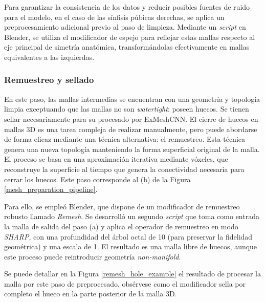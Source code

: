 Para garantizar la consistencia de los datos y reducir posibles fuentes de ruido para el modelo, en el caso de las sínfisis púbicas derechas, se aplica un preprocesamiento adicional previo al paso de limpieza. Mediante un \textit{script} en Blender, se utiliza el modificador de espejo para reflejar estas mallas respecto al eje principal de simetría anatómica, transformándolas efectivamente en mallas equivalentes a las izquierdas.

\subsubsection{Remuestreo y sellado}
En este paso, las mallas intermedias se encuentran con una geometría y topología limpia exceptuando que las mallas no son \textit{watertight}: poseen huecos. Se tienen sellar necesariamente para su procesado por ExMeshCNN. El cierre de huecos en mallas 3D es una tarea compleja de realizar manualmente, pero puede abordarse de forma eficaz mediante una técnica alternativa: el remuestreo. Esta técnica genera una nueva topología manteniendo la forma superficial original de la malla. El proceso se basa en una aproximación iterativa mediante vóxeles, que reconstruye la superficie al tiempo que genera la conectividad necesaria para cerrar los huecos. Este paso corresponde al (b) de la Figura \ref{mesh_preparation_pipeline}.

Para ello, se empleó Blender, que dispone de un modificador de remuestreo robusto llamado \textit{Remesh}. Se desarrolló un segundo \textit{script} que toma como entrada la malla de salida del paso (a) y aplica el operador de remuestreo en modo \textit{SHARP}, con una profundidad del árbol octal de 10 (para preservar la fidelidad geométrica) y una escala de 1. El resultado es una malla libre de huecos, aunque este proceso puede reintroducir geometría \textit{non-manifold}.

Se puede detallar en la Figura \ref{remesh_hole_example} el resultado de procesar la malla por este paso de preprocesado, obsérvese como el modificador sella por completo el hueco en la parte posterior de la malla 3D.

